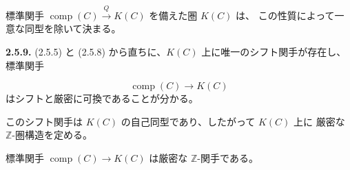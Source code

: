 標準関手 $\operatorname{comp}(C)\xrightarrow{Q}K(C)$ を備えた圏 $K(C)$ は、
この性質によって一意な同型を除いて決まる。

\noindent\textbf{2.5.9.}\quad
(2.5.5) と (2.5.8) から直ちに、$K(C)$ 上に唯一のシフト関手が存在し、
標準関手

\begin{equation*}
  \operatorname{comp}(C)\longrightarrow K(C)
\end{equation*}
はシフトと厳密に可換であることが分かる。

このシフト関手は $K(C)$ の自己同型であり、したがって $K(C)$ 上に
厳密な $\mathbb Z$-圏構造を定める。

標準関手 $\operatorname{comp}(C)\longrightarrow K(C)$ は厳密な
$\mathbb Z$-関手である。
